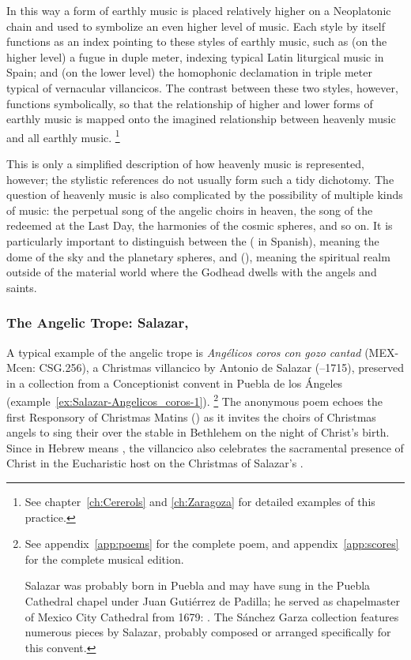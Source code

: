In this way a form of earthly music is placed relatively higher on a Neoplatonic chain and used to symbolize an even higher level of music. 
Each style by itself functions as an index pointing to these styles of earthly music, such as (on the higher level) a fugue in duple meter, indexing typical Latin liturgical music in Spain; and (on the lower level) the homophonic declamation in triple meter typical of vernacular villancicos.
The contrast between these two styles, however, functions symbolically, so that the relationship of higher and lower forms of earthly music is mapped onto the imagined relationship between heavenly music and all earthly music.%
	\footnote{%
	See chapter~\ref{ch:Cererols} and \ref{ch:Zaragoza} for detailed examples of this practice.
	}

This is only a simplified description of how heavenly music is represented, however; the stylistic references do not usually form such a tidy dichotomy.
The question of heavenly music is also complicated by the possibility of multiple kinds of  music: the perpetual song of the angelic choirs in heaven, the song of the redeemed at the Last Day, the harmonies of the cosmic spheres, and so on.
It is particularly important to distinguish between the  ( in Spanish), meaning the dome of the sky and the planetary spheres, and  (), meaning the spiritual realm outside of the material world where the Godhead dwells with the angels and saints.

\subsubsection{The Angelic Trope: Salazar, }

A typical example of the angelic trope is \emph{Angélicos coros con gozo cantad} (MEX-Mcen: CSG.256), a Christmas villancico by Antonio de Salazar (--1715), preserved in a collection from a Conceptionist convent in Puebla de los Ángeles (example~\ref{ex:Salazar-Angelicos_coros-1}).%
	\footnote{%
	See appendix~\ref{app:poems} for the complete poem, and appendix~\ref{app:scores} for the complete musical edition.
	
Salazar was probably born in Puebla and may have sung in the Puebla Cathedral chapel under Juan Gutiérrez de Padilla; he served as chapelmaster of Mexico City Cathedral from 1679: \autocite{Koegel:Salazar}. 
The Sánchez Garza collection features numerous pieces by Salazar, probably composed or arranged specifically for this convent.
	}
The anonymous poem echoes the first Responsory of Christmas Matins () as it invites the choirs of Christmas angels to sing their  over the stable in Bethlehem on the night of Christ's birth.
Since  in Hebrew means , the villancico also celebrates the sacramental presence of Christ in the Eucharistic host on the Christmas of Salazar's .

